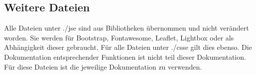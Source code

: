 \subsection{Weitere Dateien}
Alle Dateien unter {\glqq ./jse\grqq} sind aus Bibliotheken übernommen und nicht verändert worden. Sie werden für Bootstrap, Fontawesome, Leaflet, Lightbox oder als Abhängigkeit dieser gebraucht. Für alle Dateien unter {\glqq ./csse\grqq} gilt dies ebenso. Die Dokumentation entsprechender Funktionen ist nicht teil dieser Dokumentation. Für diese Dateien ist die jeweilige Dokumentation zu verwenden. 
